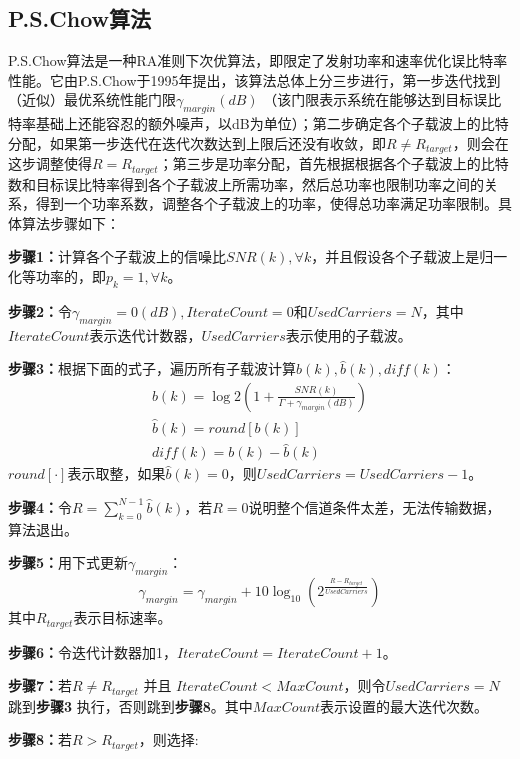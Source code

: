 \subsection{P.S.Chow算法}
P.S.Chow算法\cite{chow1995practical}是一种RA准则下次优算法，即限定了发射功率和速率优化误比特率性能。它由P.S.Chow于1995年提出，该算法总体上分三步进行，第一步迭代找到（近似）最优系统性能门限$\gamma_{margin}(dB)$ （该门限表示系统在能够达到目标误比特率基础上还能容忍的额外噪声，以dB为单位）；第二步确定各个子载波上的比特分配，如果第一步迭代在迭代次数达到上限后还没有收敛，即$R\neq R_{target}$，则会在这步调整使得$R=R_{target}$；第三步是功率分配，首先根据根据各个子载波上的比特数和目标误比特率得到各个子载波上所需功率，然后总功率也限制功率之间的关系，得到一个功率系数，调整各个子载波上的功率，使得总功率满足功率限制。具体算法步骤如下：
\begin{description}
\item{\bf{步骤1：}}计算各个子载波上的信噪比$SNR(k),\forall k$，并且假设各个子载波上是归一化等功率的，即$p_k=1, \forall k$。
\item{\bf{步骤2：}}令$\gamma_{margin}=0 (dB), IterateCount =0$和$UsedCarriers=N$，其中$IterateCount$表示迭代计数器，$UsedCarriers$表示使用的子载波。
\item{\bf{步骤3：}}根据下面的式子，遍历所有子载波计算$b(k),\hat{b}(k),diff(k)$：
\begin{eqnarray}
b(k)=\log2(1+\frac{SNR(k)}{\Gamma+\gamma_{margin}(dB)})\\
\hat{b}(k)=round[b(k)]\\
diff(k)=b(k)-\hat{b}(k)
\end{eqnarray}
$round[\cdot]$表示取整，如果$\hat{b}(k)=0$，则$UsedCarriers=UsedCarriers-1$。
\item{\bf{步骤4：}}令$R=\sum_{k=0}^{N-1}\hat{b}(k)$，若$R=0$说明整个信道条件太差，无法传输数据，算法退出。
\item{\bf{步骤5：}}用下式更新$\gamma_{margin}$：
\begin{equation}
\gamma_{margin}=\gamma_{margin}+10\log_{10}(2^{\frac{R-R_{target}}{UsedCarriers}})
\end{equation}
其中$R_{target}$表示目标速率。
\item{\bf{步骤6：}}令迭代计数器加1，$IterateCount=IterateCount+1$。
\item{\bf{步骤7：}}若$R\neq R_{target}$ 并且 $IterateCount<MaxCount$，则令$UsedCarriers=N$跳到\textbf{步骤3} 执行，否则跳到\textbf{步骤8}。其中$MaxCount$表示设置的最大迭代次数。
\item{\bf{步骤8：}}若$R>R_{target}$，则选择:

\end{description}
